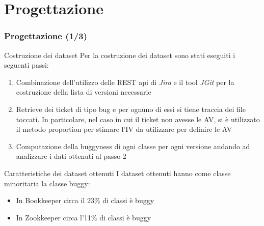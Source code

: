 \documentclass[
	usepdftitle=false,
	xcolor={table, dvipsnames},
	hyperref={
		pdftitle={Machine Learning per Software Engineering},
    	pdfauthor={Alessando Chillotti}
    }
]{beamer}
\begin{document}
\section{Progettazione}
\begin{frame}
\frametitle{Progettazione (1/3)}
\begin{block}{Costruzione dei dataset}
Per la costruzione dei dataset sono stati eseguiti i seguenti passi:
\begin{enumerate}
\item Combinazione dell'utilizzo delle REST api di \textit{Jira} e il tool \textit{JGit} per la costruzione della lista di versioni necessarie
\item Retrieve dei ticket di tipo bug e per ognuno di essi si tiene traccia dei file toccati. In particolare, nel caso in cui il ticket non avesse le AV, si è utilizzato il metodo proportion per stimare l'IV da utilizzare per definire le AV
\item Computazione della buggyness di ogni classe per ogni versione andando ad analizzare i dati ottenuti al passo 2
\end{enumerate}
\end{block}

\begin{block}{Caratteristiche dei dataset ottenuti}
I dataset ottenuti hanno come classe minoritaria la classe buggy:
\begin{itemize}
\item In Bookkeeper circa il 23\% di classi è buggy
\item In Zookkeeper circa l'11\% di classi è buggy
\end{itemize}
\end{block}
\end{frame}
\end{document}
